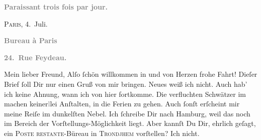 \begin{ledgroupsized}[t]{13cm}
           \pstart
           \begin{otherlanguage}{french}\textcolor{gray}{\textbf{\textbf{Paraissant trois fois par jour.}}}\end{otherlanguage}\hfill \textsc{Paris}, 4. Juli.\pend
           \pstart
           \begin{otherlanguage}{french}\textcolor{gray}{\textbf{\textbf{Bureau à Paris}}}\end{otherlanguage}\pend
           \pstart
           \begin{otherlanguage}{french}\textcolor{gray}{\textbf{\textbf{24. Rue Feydeau.}}}\end{otherlanguage}\pend
           \pstart\center{}Mein lieber Freund,\pend\pstart
           Alſo ſchön willkommen in \label{K_L02780-1v}\label{K_L02780-1h} und von Herzen frohe
               Fahrt!\pend
           \pstart
           Dieſer Brief ſoll Dir nur einen Gruß von mir \strikeout{\textcolor{gray}{×}\-\textcolor{gray}{×}\-\textcolor{gray}{×}} bringen.\pend
           \pstart
           Neues weiß ich nicht.\pend
           \pstart
           Auch hab’ ich keine Ahnung, wann ich von hier fortkomme. Die verfluchten Schwätzer im
                  {\pb}\label{K_L02780-3v}\label{K_L02780-3h} machen keiner\textcolor{gray}{l}lei Anſtalten, in die Ferien zu gehen. Auch
               ſonſt erſcheint mir meine Reiſe im dunkelſten Nebel.\pend
           \pstart
           Ich ſchreibe Dir  nach Hamburg,
               weil das noch im Bereich der Vorſtellungs-Möglichkeit liegt. Aber kannſt Du Dir,
               ehrlich geſagt, ein \textsc{Poste restante}-Büreau in \textsc{Trondjhem} vorſtellen? Ich nicht.\pend

\end{ledgroupsized}
